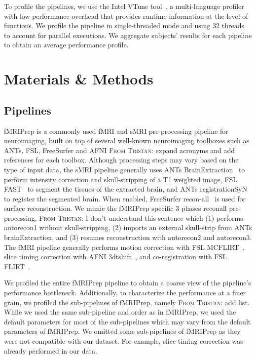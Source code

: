 \documentclass[conference]{IEEEtran}
\newcommand{\TG}[1]{\color{blue}\textsc{From Tristan: }#1\color{black}}
\begin{document}
To profile the pipelines, we use the Intel VTune tool~\cite{vtune-profiler}, a multi-language profiler with low performance overhead that provides runtime information at the level of functions. We profile the pipeline in single-threaded mode and using 32 threads to account for parallel executions. We aggregate subjects' results for each pipeline to obtain an average performance profile. 

\section{Materials \& Methods}
\subsection{Pipelines}
fMRIPrep is a commonly used fMRI and sMRI pre-processing pipeline for neuroimaging, built on top of several well-known neuroimaging toolboxes such as ANTs, FSL, FreeSurfer and AFNI \TG{expand acronyms and add references for each toolbox}. Although processing steps may vary based on the type of input data, the sMRI pipeline generally uses ANTs BrainExtraction~\cite{Tustison2010-gg,Avants2008-ea} to perform intensity correction and skull-stripping of a T1 weighted image, FSL FAST~\cite{Zhang2001-hx} to segment the tissues of the extracted brain, and ANTs registrationSyN~\cite{Avants2008-ea} to register the segmented brain. When enabled, FreeSurfer recon-all~\cite{Dale1999-wu} is used for surface reconstruction. We mimic the fMRIPrep specific 3 phases reconall pre-processing, \TG{I don't understand this sentence} which (1) performs autorecon1 without skull-stripping, (2) imports an external skull-strip from ANTs brainExtraction, and (3) resumes reconstruction with autorecon2 and autorecon3. The fMRI pipeline generally performs motion correction with FSL MCFLIRT~\cite{Jenkinson2002-od}, slice timing correction with AFNI 3dtshift~\cite{Cox1996-nk}, and co-registration with FSL FLIRT~\cite{Jenkinson2002-od,Jenkinson2001-eu,Greve2009-dw}.

We profiled the entire fMRIPrep pipeline to obtain a coarse view of the pipeline's performance bottleneck. Additionally, to characterize the performance at a finer grain, we profiled the sub-pipelines of fMRIPrep, namely \TG{add list}. While we used the same sub-pipeline and order as in fMRIPrep, we used the default parameters for most of the sub-pipelines which may vary from the default parameters of fMRIPrep. We omitted some sub-pipelines of fMRIPrep as they were not compatible with our dataset. For example, slice-timing correction was already performed in our data.
\end{document}
